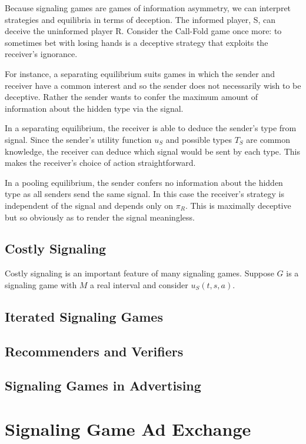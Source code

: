 \documentclass{article}
\begin{document}
Because signaling games are games of information asymmetry, we can interpret strategies and equilibria in terms of deception. The informed player, S, can deceive the uninformed player R. Consider the Call-Fold game once more: to sometimes bet with losing hands is a deceptive strategy that exploits the receiver's ignorance. 

 For instance, a separating equilibrium suits games in which the sender and receiver have a common interest and so the sender does not necessarily wish to be deceptive. Rather the sender wants to confer the maximum amount of information about the hidden type via the signal.

In a separating equilibrium, the receiver is able to deduce the sender's type from signal. Since the sender's utility function $u_{S}$ and possible types $T_S$ are common knowledge, the receiver can deduce which signal would be sent by each type. This makes the receiver's choice of action straightforward.

In a pooling equilibrium, the sender confers no information about the hidden type as all senders send the same signal. In this case the receiver's strategy is independent of the signal and depends only on $\pi_{ R}$. This is maximally deceptive but so obviously as to render the signal meaningless.

\subsection{Costly Signaling}

Costly signaling is an important feature of many signaling games. Suppose $G$ is a signaling game with $M$ a real interval and consider $u_{S}(t,s,a)$.

\subsection{Iterated Signaling Games}

\subsection{Recommenders and Verifiers}

\subsection{Signaling Games in Advertising}

\newpage

\section{Signaling Game Ad Exchange}
\end{document}
